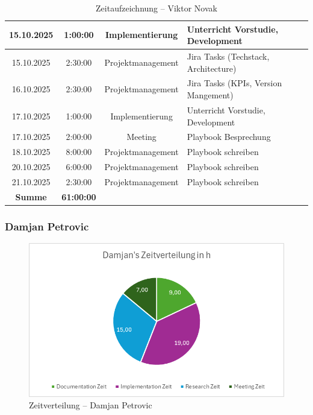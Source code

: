 \documentclass{article}
\begin{document}
\begin{table}[H]
\begin{tabularx}{\textwidth}{|c|c|c|X|}
    15.10.2025 & 1:00:00 & Implementierung   & Unterricht Vorstudie, Development \\ \hline
    15.10.2025 & 2:30:00 & Projektmanagement & Jira Tasks (Techstack, Architecture) \\ \hline
    16.10.2025 & 2:30:00 & Projektmanagement & Jira Tasks (KPIs, Version Mangement) \\ \hline
    17.10.2025 & 1:00:00 & Implementierung   & Unterricht Vorstudie, Development \\ \hline
    17.10.2025 & 2:00:00 & Meeting           & Playbook Besprechung \\ \hline
    18.10.2025 & 8:00:00 & Projektmanagement & Playbook schreiben \\ \hline
    20.10.2025 & 6:00:00 & Projektmanagement & Playbook schreiben \\ \hline
    21.10.2025 & 2:30:00 & Projektmanagement & Playbook schreiben \\ \hline
    \rowcolor{black!10}\textbf{Summe} & \textbf{61:00:00} & & \\ \hline
  \end{tabularx}
  \caption{Zeitaufzeichnung – Viktor Novak}
  \label{tab:zeit-viktor}
\end{table}


\subsubsection*{Damjan Petrovic}

\begin{figure}[H]
  \centering
  \includegraphics[width=\textwidth]{Damjan_Zeitverteilung.png}
  \caption{Zeitverteilung – Damjan Petrovic}
  \label{fig:damjan-zeitverteilung}
\end{figure}
\end{document}
